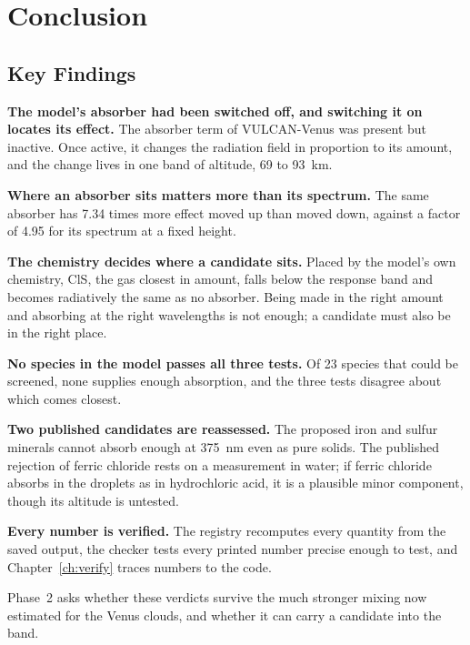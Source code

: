 \chapter{Conclusion}
\label{ch:conclusion}

\section{Key Findings}
\label{sec:key-findings}

\textbf{The model's absorber had been switched off, and switching it on locates its
effect.} The absorber term of VULCAN-Venus was present but inactive. Once active, it
changes the radiation field in proportion to its amount, and the change lives in one band
of altitude, 69 to 93~km.

\textbf{Where an absorber sits matters more than its spectrum.} The same absorber has 7.34
times more effect moved up than moved down, against a factor of 4.95 for its spectrum at
a fixed height.

\textbf{The chemistry decides where a candidate sits.} Placed by the model's own
chemistry, ClS, the gas closest in amount, falls below the response band and
becomes radiatively the same as no absorber. Being made in the right amount and absorbing
at the right wavelengths is not enough; a candidate must also be in the right place.

\textbf{No species in the model passes all three tests.} Of 23 species that could be
screened, none supplies enough absorption, and the three tests disagree about which comes
closest.

\textbf{Two published candidates are reassessed.} The proposed iron and sulfur minerals
cannot absorb enough at 375~nm even as pure solids. The published rejection of ferric
chloride rests on a measurement in water; if ferric chloride absorbs in the droplets as in
hydrochloric acid, it is a plausible minor component, though its altitude is untested.

\textbf{Every number is verified.} The registry recomputes every quantity from the saved
output, the checker tests every printed number precise enough to test, and
Chapter~\ref{ch:verify} traces numbers to the code.

Phase~2 asks whether these verdicts survive the much stronger mixing now estimated for
the Venus clouds, and whether it can carry a candidate into the band.
